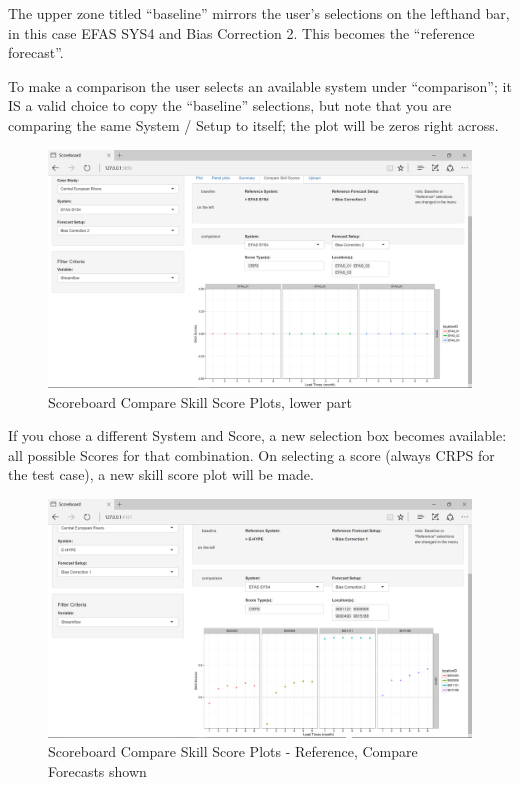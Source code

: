 \documentclass[logos,parttoc,morelanguage=french,morelanguage=german]{orsay-memoire}
\begin{document}
The upper zone titled ``baseline'' mirrors the user's selections on the lefthand bar, in this case EFAS SYS4 and Bias Correction 2. This becomes the ``reference forecast''.

To make a comparison the user selects an available system under ``comparison''; it IS a valid choice to copy the ``baseline'' selections, but note that you are comparing the same System / Setup to itself; the plot will be zeros right across.

\begin{figure}[H]
\centering
\includegraphics[width=0.85\linewidth]{images/isb5.png}
  \caption{Scoreboard Compare Skill Score Plots, lower part}
  \label{fig:isb5}
\end{figure}

If you chose a different System and Score, a new selection box becomes available: all possible Scores for that combination. On selecting a score (always CRPS for the test case), a new skill score plot will be made.


\begin{figure}[H]
\centering
\includegraphics[width=0.85\linewidth]{images/isb5_2.png}
  \caption{Scoreboard Compare Skill Score Plots - Reference, Compare Forecasts shown}
  \label{fig:isb5_2}
\end{figure}
\end{document}
